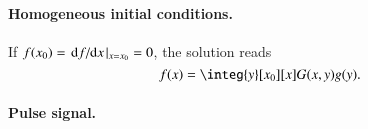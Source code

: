     \paragraph{Homogeneous initial conditions.} %
    If $f(x_0)=\dv*{f}{x}\rvert_{x=x_0}=0$, the solution reads
    \begin{equation}
        f(x) = \integ{y}[x_0][x] G(x,y)g(y).
    \end{equation}



    \paragraph{Pulse signal.} %

    
    











